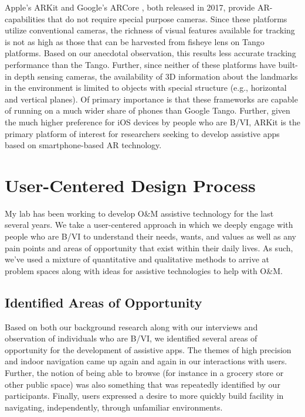 \documentclass[chi_draft]{sigchi}
\newcommand{\BVI}{B/VI\xspace}
\newcommand{\OM}{O\&M\xspace}
\begin{document}
Apple's ARKit \cite{arkit} and Google's ARCore \cite{arcore}, both released in 2017, provide AR-capabilities that do not require special purpose cameras.  Since these platforms utilize conventional cameras, the richness of visual features available for tracking is not as high as those that can be harvested from fisheye lens on Tango platforms.  Based on our anecdotal observation, this results less accurate tracking performance than the Tango.  Further, since neither of these platforms have built-in depth sensing cameras, the availability of 3D information about the landmarks in the environment is limited to objects with special structure (e.g., horizontal and vertical planes).  Of primary importance is that these frameworks are capable of running on a much wider share of phones than Google Tango.  Further, given the much higher preference for iOS devices by people who are \BVI \cite{morris2014blind}, ARKit is the primary platform of interest for researchers seeking to develop assistive apps based on smartphone-based AR technology.

\section{User-Centered Design Process}
My lab has been working to develop \OM assistive technology for the last several years.  We take a user-centered approach in which we deeply engage with people who are \BVI to understand their needs, wants, and values as well as any pain points and areas of opportunity that exist within their daily lives.  As such, we've used a mixture of quantitative and qualitative methods to arrive at problem spaces along with ideas for assistive technologies to help with \OM.

\subsection{Identified Areas of Opportunity}
Based on both our background research along with our interviews and observation of individuals who are \BVI, we identified several areas of opportunity for the development of assistive apps.  The themes of high precision and indoor navigation came up again and again in our interactions with users.  Further, the notion of being able to browse (for instance in a grocery store or other public space) was also something that was repeatedly identified by our participants.  Finally, users expressed a desire to more quickly build facility in navigating, independently, through unfamiliar environments.
\end{document}

